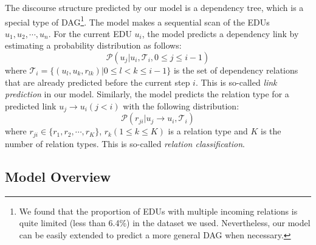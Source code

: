 \documentclass[letterpaper]{article} \usepackage{aaai19}  \usepackage{times}  \usepackage{helvet}  \usepackage{courier}  \usepackage{url}  \usepackage{graphicx}  \usepackage{amssymb}
\begin{document}
The discourse structure predicted by our model is a dependency tree, which is a special type of DAG\footnote{We found that the proportion of EDUs with multiple incoming relations is quite limited (less than 6.4\%) in the dataset we used. Nevertheless, our model can be easily extended to predict a more general DAG when necessary.}.
The model makes a sequential scan of the EDUs $u_1,u_2,\cdots,u_n$. For the current EDU $u_i$, the model predicts a dependency link by estimating a probability distribution as follows:
\begin{equation}
\mathcal{P}(u_j|u_i,\mathcal{T}_i, 0 \leq j \leq i-1)
\end{equation}
where $\mathcal{T}_i=\{(u_l,u_k,r_{lk})|  0 \leq l < k \leq i-1 \}$ is the set of dependency relations that are already predicted before the current step $i$.  This is so-called {\it link prediction} in our model.
Similarly, the model predicts the relation type for a predicted link $u_j \rightarrow u_i (j<i)$ with the following distribution:
\begin{equation}
\mathcal{P}(r_{ji}|u_j \rightarrow u_i,\mathcal{T}_i)
\end{equation}
where $r_{ji}\in\{r_1,r_2, \cdots, r_K\}$, $r_{k}(1\leq k\leq K)$ is a relation type and $K$ is the number of relation types. This is so-called {\it relation classification}.

\subsection{Model Overview}
\end{document}
